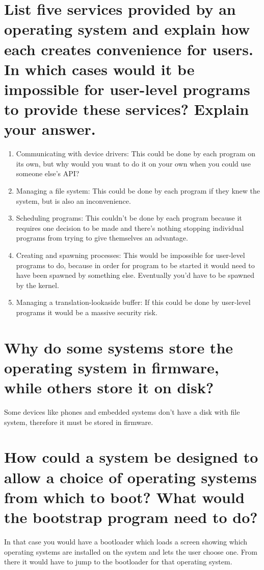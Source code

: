 \documentclass{book}%
\begin{document}
\section{List five services provided by an operating system and explain how each creates convenience for users. In which cases would it be impossible for user-level programs to provide these services? Explain your answer.}
\begin{enumerate}
\item Communicating with device drivers: This could be done by each program on its own, but why would you want to do it on your own when you could use someone else's API?
\item Managing a file system: This could be done by each program if they knew the system, but is also an inconvenience.
\item Scheduling programs: This couldn't be done by each program because it requires one decision to be made and there's nothing stopping individual programs from trying to give themselves an advantage.
\item Creating and spawning processes: This would be impossible for user-level programs to do, because in order for  program to be started it would need to have been spawned by something else. Eventually you'd have to be spawned by the kernel.
\item Managing a translation-lookaside buffer: If this could be done by user-level programs it would be a massive security risk.
\end{enumerate}
\section{Why do some systems store the operating system in firmware, while others store it on disk?}
Some devices like phones and embedded systems don't have a disk with  file system, therefore it must be stored in firmware.
\section{How could a system be designed to allow a choice of operating systems from which to boot? What would the bootstrap program need to do?}
In that case you would have a bootloader which loads a screen showing which operating systems are installed on the system and lets the user choose one. From there it would have to jump to the bootloader for that operating system.
\end{document}
